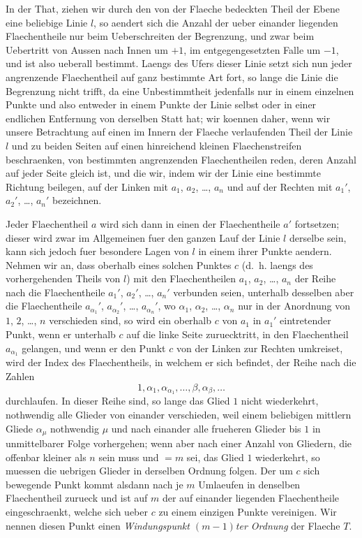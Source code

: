 \documentclass[12pt,a4paper]{book}
\theoremstyle{definition}
\theoremstyle{remark}
\begin{document}
In der That, ziehen wir durch den von der Flaeche bedeckten Theil der Ebene eine beliebige Linie $l$, so aendert sich die Anzahl der ueber einander liegenden Flaechentheile nur beim Ueberschreiten der Begrenzung, und zwar beim Uebertritt von Aussen nach Innen um $+1$, im entgegengesetzten Falle um $-1$, und ist also ueberall bestimmt. Laengs des Ufers dieser Linie setzt sich nun jeder angrenzende Flaechentheil auf ganz bestimmte Art fort, so lange die Linie die Begrenzung nicht trifft, da eine Unbestimmtheit jedenfalls nur in einem einzelnen Punkte und also entweder in einem Punkte der Linie selbst oder in einer endlichen Entfernung von derselben Statt hat; wir koennen daher, wenn wir unsere Betrachtung auf einen im Innern der Flaeche verlaufenden Theil der Linie $l$ und zu beiden Seiten auf einen hinreichend kleinen Flaechenstreifen beschraenken, von bestimmten angrenzenden Flaechentheilen reden, deren Anzahl auf jeder Seite gleich ist, und die wir, indem wir der Linie eine bestimmte Richtung beilegen, auf der Linken mit $a_1$, $a_2$, \dots, $a_n$ und auf der Rechten mit $a_1'$, $a_2'$, \dots, $a_n'$ bezeichnen.

Jeder Flaechentheil $a$ wird sich dann in einen der Flaechentheile $a'$ fortsetzen; dieser wird zwar im Allgemeinen fuer den ganzen Lauf der Linie $l$ derselbe sein, kann sich jedoch fuer besondere Lagen von $l$ in einem ihrer Punkte aendern. Nehmen wir an, dass oberhalb eines solchen Punktes $c$ (d.\ h. laengs des vorhergehenden Theils von $l$) mit den Flaechentheilen $a_1$, $a_2$, \dots, $a_n$ der Reihe nach die Flaechentheile $a_1'$, $a_2'$, \dots, $a_n'$ verbunden seien, unterhalb desselben aber die Flaechentheile $a_{\alpha_1}'$, $a_{\alpha_2}'$, \dots, $a_{\alpha_n}'$, wo $\alpha_1$, $\alpha_2$, \dots, $\alpha_n$ nur in der Anordnung von $1$, $2$, \dots, $n$ verschieden sind, so wird ein oberhalb $c$ von $a_1$ in $a_1'$ eintretender Punkt, wenn er unterhalb $c$ auf die linke Seite zuruecktritt, in den Flaechentheil $a_{\alpha_1}$ gelangen, und wenn er den Punkt $c$ von der Linken zur Rechten umkreiset, wird der Index des Flaechentheils, in welchem er sich befindet, der Reihe nach die Zahlen
\[
1, \alpha_1, \alpha_{\alpha_1}, \dots, \beta, \alpha_\beta, \dots
\]
durchlaufen. In dieser Reihe sind, so lange das Glied $1$ nicht wiederkehrt, nothwendig alle Glieder von einander verschieden, weil einem beliebigen mittlern Gliede $\alpha_\mu$ nothwendig $\mu$ und nach einander alle frueheren Glieder bis $1$ in unmittelbarer Folge vorhergehen; wenn aber nach einer Anzahl von Gliedern, die offenbar kleiner als $n$ sein muss und $= m$ sei, das Glied $1$ wiederkehrt, so muessen die uebrigen Glieder in derselben Ordnung folgen. Der um $c$ sich bewegende Punkt kommt alsdann nach je $m$ Umlaeufen in denselben Flaechentheil zurueck und ist auf $m$ der auf einander liegenden Flaechentheile eingeschraenkt, welche sich ueber $c$ zu einem einzigen Punkte vereinigen. Wir nennen diesen Punkt einen \emph{Windungspunkt $(m-1)$ter Ordnung} der Flaeche $T$.
\end{document}
